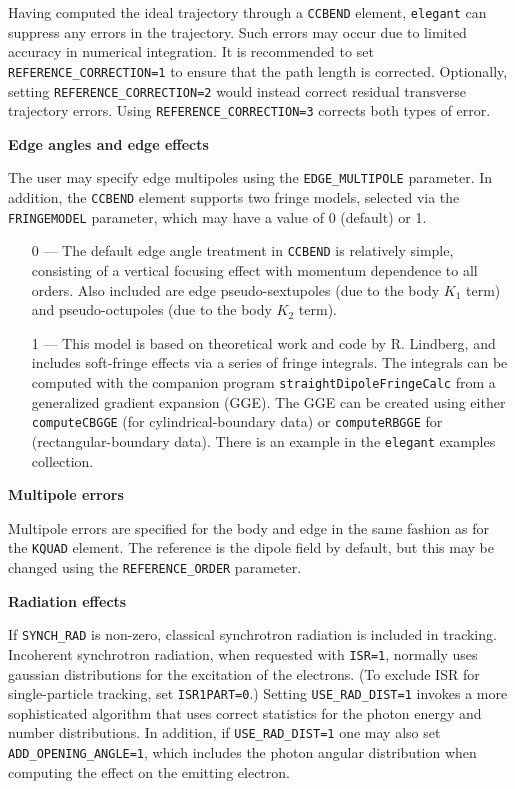 Having computed the ideal trajectory through a \verb|CCBEND| element, {\tt elegant}
can suppress any errors in the trajectory. Such errors may occur due to
limited accuracy in numerical integration. It is recommended to
set \verb|REFERENCE_CORRECTION=1| to ensure that the path length is corrected.
Optionally, setting \verb|REFERENCE_CORRECTION=2| would instead correct
residual transverse trajectory errors. Using \verb|REFERENCE_CORRECTION=3| corrects
both types of error.

{\bf Edge angles and edge effects} 

The user may specify edge multipoles using the \verb|EDGE_MULTIPOLE| parameter. In addition, 
the \verb|CCBEND| element supports two fringe models, selected via the \verb|FRINGEMODEL| parameter, 
which may have a value of 0 (default) or 1.
\begin{itemize}
\item[0] --- The default edge angle treatment in \verb|CCBEND| is relatively simple, consisting of a 
vertical focusing effect with momentum dependence to all orders.
Also included are edge pseudo-sextupoles (due to the body $K_1$ term) and
pseudo-octupoles (due to the body $K_2$ term).
\item[1] --- This model is based on theoretical work and code by R. Lindberg, and includes soft-fringe
  effects via a series of fringe integrals. The integrals can be computed with the companion program
  \verb|straightDipoleFringeCalc| from a generalized gradient expansion (GGE). The  GGE can be
  created using either \verb|computeCBGGE| (for cylindrical-boundary data) or \verb|computeRBGGE|
  for (rectangular-boundary data). There is an example in the {\tt elegant} examples collection.
\end{itemize}

{\bf Multipole errors}

Multipole errors are specified for the body and edge in the same fashion as for the
\verb|KQUAD| element.
The reference is the dipole field by default, but this may be changed using the
\verb|REFERENCE_ORDER| parameter.

{\bf Radiation effects}

If \verb|SYNCH_RAD| is non-zero, classical synchrotron radiation is included in tracking.
Incoherent synchrotron radiation, when requested with {\tt ISR=1},
normally uses gaussian distributions for the excitation of the electrons.
(To exclude ISR for single-particle tracking, set \verb|ISR1PART=0|.)
Setting {\tt USE\_RAD\_DIST=1} invokes a more sophisticated algorithm that
uses correct statistics for the photon energy and number distributions.
In addition, if {\tt USE\_RAD\_DIST=1} one may also set {\tt ADD\_OPENING\_ANGLE=1},
which includes the photon angular distribution when computing the effect on 
the emitting electron.  

